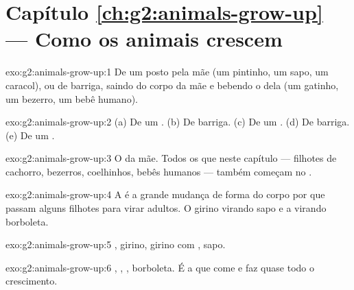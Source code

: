 \section*{Capítulo \ref{ch:g2:animals-grow-up} --- Como os animais crescem}

\begin{solution}{exo:g2:animals-grow-up:1}
De um  posto pela mãe (um pintinho, um sapo, um caracol), ou de
barriga, saindo do corpo da mãe e bebendo o  dela (um gatinho,
um bezerro, um bebê humano).
\end{solution}

\begin{solution}{exo:g2:animals-grow-up:2}
(a) De um . (b) De barriga. (c) De um . (d) De barriga. (e) De
um .
\end{solution}

\begin{solution}{exo:g2:animals-grow-up:3}
O  da mãe. Todos os  que  neste
capítulo --- filhotes de cachorro, bezerros, coelhinhos, bebês
humanos --- também começam no .
\end{solution}

\begin{solution}{exo:g2:animals-grow-up:4}
A  é a grande mudança de forma do corpo por que passam
alguns filhotes para virar adultos. O girino virando sapo e a
 virando borboleta.
\end{solution}

\begin{solution}{exo:g2:animals-grow-up:5}
, girino, girino com , sapo.
\end{solution}

\begin{solution}{exo:g2:animals-grow-up:6}
, , , borboleta. É a  que come  e
faz quase todo o crescimento.
\end{solution}

